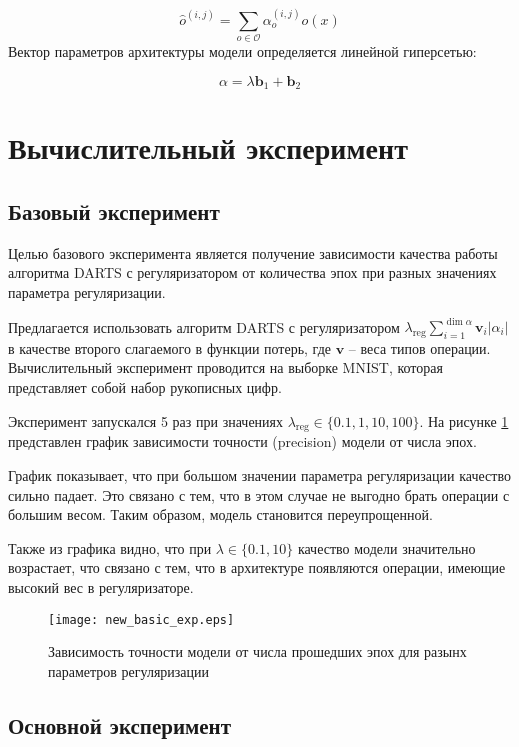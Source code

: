 \documentclass[12pt, twoside]{article}
\begin{document}
 $$\hat{o}^{(i, j)} = \sum_{o\in \mathcal{O}}\alpha^{(i, j)}_oo(x)$$
Вектор параметров архитектуры модели определяется линейной гиперсетью:

$$\alpha = \lambda\mathbf{b}_1 + \mathbf{b}_2$$


 
 \section{Вычислительный эксперимент}
 
 \subsection{Базовый эксперимент}
 Целью базового эксперимента является получение зависимости качества работы алгоритма DARTS с регуляризатором от количества эпох при разных значениях параметра регуляризации.
 
 Предлагается использовать алгоритм DARTS с регуляризатором $\lambda_{\text{reg}}\sum_{i=1}^{\dim\alpha}\mathbf{v}_i|\alpha_i|$ в качестве второго слагаемого в функции потерь, где $\mathbf{v}$ -- веса типов операции. Вычислительный эксперимент проводится на выборке MNIST\cite{lecun-mnisthandwrittendigit-2010}, которая представляет собой набор рукописных цифр.
 
Эксперимент запускался 5 раз при значениях $\lambda_{\text{reg}} \in \{0.1, 1, 10, 100\}$. На рисунке \ref{fig:basic_exp} представлен график зависимости точности (precision) модели от числа эпох.

График показывает, что при большом значении параметра регуляризации качество сильно падает. Это связано с тем, что в этом случае не выгодно брать операции с большим весом. Таким образом, модель становится переупрощенной.

 Также из графика видно, что при $\lambda \in \{0.1, 10\}$ качество модели значительно возрастает, что связано с тем, что в архитектуре появляются операции, имеющие высокий вес в регуляризаторе.

\begin{figure}[H]
\centering
  \texttt{[image: new\_basic\_exp.eps]}
  \caption{Зависимость точности модели от числа прошедших эпох для разынх параметров регуляризации}
  \label{fig:basic_exp}
\end{figure}

\subsection{Основной эксперимент}
\end{document}
